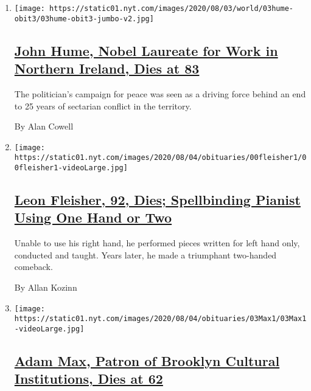 \begin{enumerate}
\def\labelenumi{\arabic{enumi}.}
\item
  \texttt{[image: https://static01.nyt.com/images/2020/08/03/world/03hume-obit3/03hume-obit3-jumbo-v2.jpg]}

  \hypertarget{john-hume-nobel-laureate-for-work-in-northern-ireland-dies-at-83}{%
  \subsection{\texorpdfstring{\href{/2020/08/03/obituaries/john-hume-dies.html}{John
  Hume, Nobel Laureate for Work in Northern Ireland, Dies at
  83}}{John Hume, Nobel Laureate for Work in Northern Ireland, Dies at 83}}\label{john-hume-nobel-laureate-for-work-in-northern-ireland-dies-at-83}}

  The politician's campaign for peace was seen as a driving force behind
  an end to 25 years of sectarian conflict in the territory.

  By Alan Cowell
\item
  \texttt{[image: https://static01.nyt.com/images/2020/08/04/obituaries/00fleisher1/00fleisher1-videoLarge.jpg]}

  \hypertarget{leon-fleisher-92-dies-spellbinding-pianist-using-one-hand-or-two}{%
  \subsection{\texorpdfstring{\href{/2020/08/02/arts/music/leon-fleisher-dead.html}{Leon
  Fleisher, 92, Dies; Spellbinding Pianist Using One Hand or
  Two}}{Leon Fleisher, 92, Dies; Spellbinding Pianist Using One Hand or Two}}\label{leon-fleisher-92-dies-spellbinding-pianist-using-one-hand-or-two}}

  Unable to use his right hand, he performed pieces written for left
  hand only, conducted and taught. Years later, he made a triumphant
  two-handed comeback.

  By Allan Kozinn
\item
  \texttt{[image: https://static01.nyt.com/images/2020/08/04/obituaries/03Max1/03Max1-videoLarge.jpg]}

  \hypertarget{adam-max-patron-of-brooklyn-cultural-institutions-dies-at-62}{%
  \subsection{\texorpdfstring{\href{/2020/08/03/arts/adam-max-patron-of-brooklyn-cultural-institutions-dies-at-62.html}{Adam
  Max, Patron of Brooklyn Cultural Institutions, Dies at
  62}}{Adam Max, Patron of Brooklyn Cultural Institutions, Dies at 62}}\label{adam-max-patron-of-brooklyn-cultural-institutions-dies-at-62}}


\end{enumerate}
